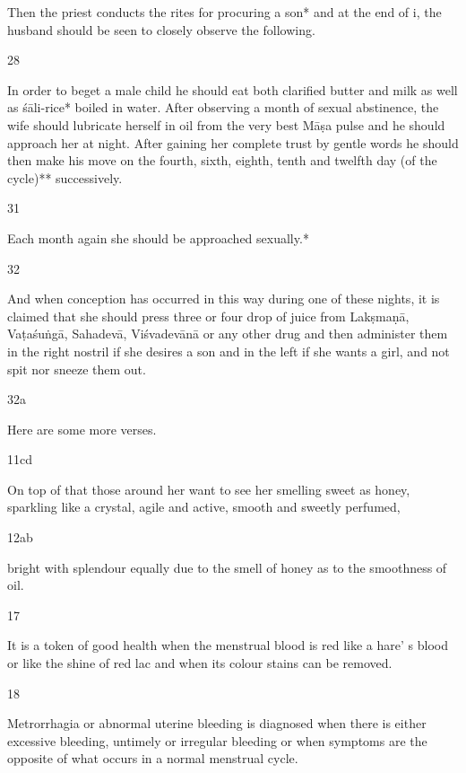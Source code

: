 \begin{translation}
\begin{tt}
Then the priest conducts the rites for procuring a son* and at the end of 
  i, the husband should be seen to closely observe the following.
  
\item[28]

 In order to beget a male child he should eat both clarified butter and 
  milk as well as śāli-rice* boiled in water. After observing a month of sexual 
  abstinence, the wife should lubricate herself in oil from the very best Māṣa 
  pulse and he should approach her at night. After gaining her complete trust by 
  gentle words he should then make his move on the fourth, sixth, eighth, tenth 
  and twelfth day (of the cycle)** successively.
  
\item[31]

Each month again she should be approached sexually.* 
  
\item[32]

And when conception has occurred in this way during one of these 
  nights, it is claimed that she should press three or four drop of juice from 
  Lakṣmaṇā, Vaṭaśuṅgā, Sahadevā, Viśvadevānā or any other drug and then 
  administer them in the right nostril if she desires a son and in the left if she 
  wants a girl, and not spit nor sneeze them out. 
  
\item[32a]

Here are some more verses.
  
\item[11cd]

On top of that those around her want to see her smelling sweet as 
  honey, sparkling like a crystal, agile and active, smooth and sweetly perfumed, 
  
\item[12ab]

bright with splendour equally due to the smell of honey as to the 
  smoothness of oil. 
  
\item[17]

It is a token of good health when the menstrual blood is red like a hare’ s 
  blood or like the shine of red lac and when its colour stains can be removed.
  
\item[18]

Metrorrhagia or abnormal uterine bleeding is diagnosed when there is 
  either excessive bleeding, untimely or irregular bleeding or when symptoms are 
  the opposite of what occurs in a normal menstrual cycle. 
  

\end{tt}
\end{translation}
